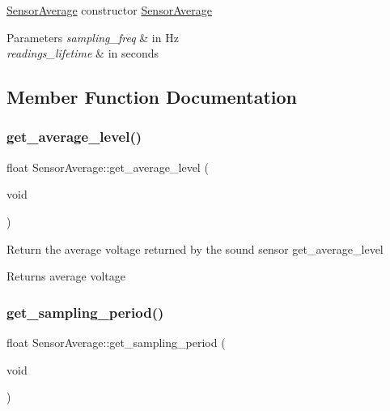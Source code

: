 \hyperlink{classSensorAverage}{Sensor\+Average} constructor  \hyperlink{classSensorAverage}{Sensor\+Average} 
\begin{DoxyParams}{Parameters}
{\em sampling\+\_\+freq} & in Hz \\
\hline
{\em readings\+\_\+lifetime} & in seconds \\
\hline
\end{DoxyParams}


\subsection{Member Function Documentation}
\mbox{\label{classSensorAverage_a61e90ca78c8cbd04444d41f60a871500}} 
\subsubsection{\texorpdfstring{get\+\_\+average\+\_\+level()}{get\_average\_level()}}
{\footnotesize\ttfamily float Sensor\+Average\+::get\+\_\+average\+\_\+level (\begin{DoxyParamCaption}\item[{void}]{ }\end{DoxyParamCaption})}

Return the average voltage returned by the sound sensor  get\+\_\+average\+\_\+level \begin{DoxyReturn}{Returns}
average voltage 
\end{DoxyReturn}
\mbox{\label{classSensorAverage_a966608312e246981d170c45a782f74c9}} 
\subsubsection{\texorpdfstring{get\+\_\+sampling\+\_\+period()}{get\_sampling\_period()}}
{\footnotesize\ttfamily float Sensor\+Average\+::get\+\_\+sampling\+\_\+period (\begin{DoxyParamCaption}\item[{void}]{ }\end{DoxyParamCaption})}

